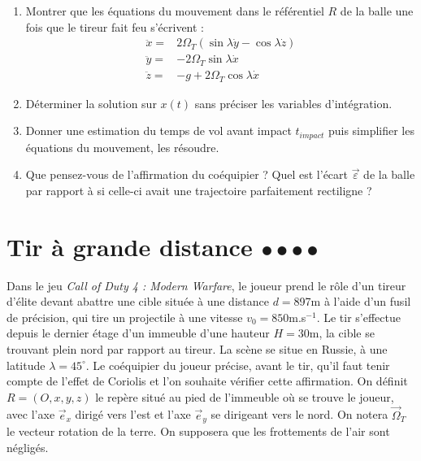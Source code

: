 \begin{enumerate}

	\item Montrer que les équations du mouvement dans le référentiel $R$ de la balle une fois que le tireur fait feu s'écrivent :
	\begin{align*}
        \ddot{x}=&2\Omega_T(\sin\lambda\dot{y}-\cos\lambda\dot{z})\\ 
        \ddot{y}=&-2\Omega_T\sin\lambda\dot{x} \\
        \ddot{z}=&-g+2\Omega_T\cos\lambda\dot{x}
	\end{align*}
	
	\item Déterminer la solution sur $x(t)$ sans préciser les variables d'intégration.
	
	\item Donner une estimation du temps de vol avant impact $t_{impact}$ puis simplifier les équations du mouvement, les résoudre.
	
	\item Que pensez-vous de l'affirmation du coéquipier ? Quel est l'écart $\vec{\varepsilon}$ de la balle par rapport à si celle-ci avait une trajectoire parfaitement rectiligne ?

\end{enumerate}

\newpage

\section{Tir à grande distance $\bullet\bullet\bullet\bullet$}

Dans le jeu \textit{Call of Duty 4 : Modern Warfare}, le joueur prend le rôle d'un tireur d'élite devant abattre une cible située à une distance $d=$897m à l'aide d'un fusil de précision, qui tire un projectile à une vitesse $v_0=850$m.s$^{-1}$. Le tir s'effectue depuis le dernier étage d'un immeuble d'une hauteur $H=30$m, la cible se trouvant plein nord par rapport au tireur. La scène se situe en Russie, à une latitude $\lambda=45^\circ$. Le coéquipier du joueur précise, avant le tir, qu'il faut tenir compte de l'effet de Coriolis et l'on souhaite vérifier cette affirmation. On définit $R=(O,x,y,z)$ le repère situé au pied de l'immeuble où se trouve le joueur, avec l'axe $\vec{e}_x$ dirigé vers l'est et l'axe $\vec{e}_y$ se dirigeant vers le nord. On notera $\vec{\Omega}_T$ le vecteur rotation de la terre. On supposera que les frottements de l'air sont négligés.

